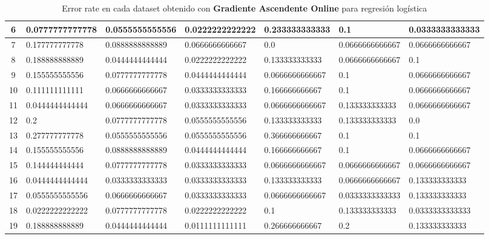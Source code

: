\documentclass[spanish, fleqn]{article}
\begin{document}
\begin{enumerate}
\begin{table}[!htbp]
\begin{tabular}{|c|l|l|l|l|l|l|}
6  & 0.0777777777778 & 0.0555555555556 & 0.0222222222222 & 0.233333333333 & 0.1 & 0.0333333333333 \\ \hline
7  & 0.177777777778 & 0.0888888888889 & 0.0666666666667 & 0.0 & 0.0666666666667 & 0.0666666666667 \\ \hline
8  & 0.188888888889 & 0.0444444444444 & 0.0222222222222 & 0.133333333333 & 0.0666666666667 & 0.1 \\ \hline
9  & 0.155555555556 & 0.0777777777778 & 0.0444444444444 & 0.0666666666667 & 0.1 & 0.0666666666667 \\ \hline
10 & 0.111111111111 & 0.0666666666667 & 0.0333333333333 & 0.166666666667 & 0.1 & 0.0666666666667 \\ \hline
11 & 0.0444444444444 & 0.0666666666667 & 0.0333333333333 & 0.0666666666667 & 0.133333333333 & 0.0666666666667 \\ \hline
12 & 0.2 & 0.0777777777778 & 0.0555555555556 & 0.133333333333 & 0.133333333333 & 0.0 \\ \hline
13 & 0.277777777778 & 0.0555555555556 & 0.0555555555556 & 0.366666666667 & 0.1 & 0.1 \\ \hline
14 & 0.155555555556 & 0.0888888888889 & 0.0444444444444 & 0.166666666667 & 0.1 & 0.0666666666667 \\ \hline
15 & 0.144444444444 & 0.0777777777778 & 0.0333333333333 & 0.0666666666667 & 0.0666666666667 & 0.0666666666667 \\ \hline
16 & 0.0444444444444 & 0.0333333333333 & 0.0333333333333 & 0.133333333333 & 0.0666666666667 & 0.133333333333 \\ \hline
17 & 0.0555555555556 & 0.0666666666667 & 0.0333333333333 & 0.0666666666667 & 0.0333333333333 & 0.133333333333 \\ \hline
18 & 0.0222222222222 & 0.0777777777778 & 0.0222222222222 & 0.1 & 0.133333333333 & 0.0333333333333 \\ \hline
19 & 0.188888888889 & 0.0444444444444 & 0.0111111111111 & 0.266666666667 & 0.2 & 0.133333333333 \\ \hline
\end{tabular}
\caption{Error rate en cada dataset obtenido con \textbf{Gradiente Ascendente Online} para regresión logística}
\label{my-label}
\end{table}


\end{enumerate}
\end{document}
